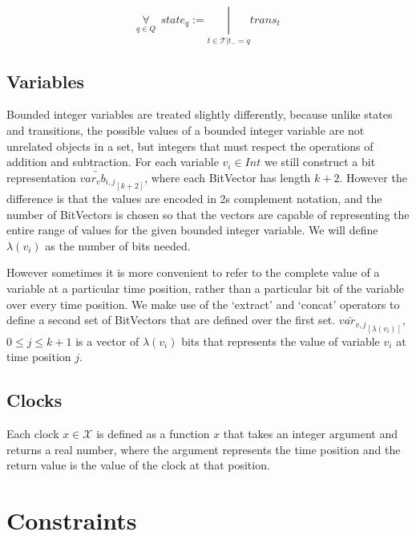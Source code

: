 \documentclass[a4paper,12pt]{article}
\newcommand*\BitAnd{\mathbin{\&}}
\newcommand*\BitOr{\mathbin{|}}
\begin{document}
\[\underset{q \in Q}{\forall}\ \ state_q := \underset{t \in \mathcal{T}|t_{-} = q}{\BitOr}trans_t\]

\subsection{Variables}\label{encoding-variables}

Bounded integer variables are treated slightly differently, because unlike
states and transitions, the possible values of a bounded integer variable are
not unrelated objects in a set, but integers that must respect the operations of
addition and subtraction. For each variable \(v_i \in Int\) we still construct a
bit representation \(\overleftarrow{var_{v}b_{i,j}}_{[k+2]}\), where each BitVector
has length \(k+2\). However the difference is that the values are encoded in 2s
complement notation, and the number of BitVectors is chosen so that the vectors
are capable of representing the entire range of values for the given bounded
integer variable. We will define \(\lambda(v_i)\) as the number of bits needed.

However sometimes it is more convenient to refer to the complete value of a
variable at a particular time position, rather than a particular bit of the
variable over every time position. We make use of the `extract' and
`concat' operators to define a second set of BitVectors that are defined over
the first set. \(\overleftarrow{var_{v,j}}_{[\lambda(v_i)]}\), \(0 \leq j \leq
k+1\) is a vector of \(\lambda(v_i)\) bits that represents the value of variable
\(v_i\) at time position \(j\).


\subsection{Clocks}\label{encoding-clocks}

Each clock \(x \in \mathcal{X}\) is defined as a function \(x\) that takes
an integer argument and returns a real number, where the argument represents the
time position and the return value is the value of the clock at that position.

\section{Constraints}\label{constraints}
\iffalse
TODO:\@ mention that the operators \(\lor, \land, \BitOr , \BitAnd, \Rightarrow\) represent
bvor, bvand, etc. (in background) -  maybe explain how you are exploiting
bvlogic to write constraints - quick comment
\fi
\end{document}

